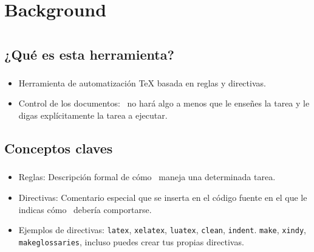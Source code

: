 \section{Background}
\begin{frame}[fragile]
\frametitle{\insertsection}
\end{frame}

\section[\arara]{\arara}

\subsection{¿Qué es esta herramienta?}

\begin{frame}
\frametitle{\insertsection}
\begin{block}{\insertsubsection}
	\begin{itemize}
		\item Herramienta de automatización \TeX{} basada en reglas y directivas.
		\item Control de los documentos: \arara\ no hará algo a menos que le enseñes la tarea y le digas explícitamente la tarea a ejecutar.
	\end{itemize}
\end{block}
\end{frame}

\subsection{Conceptos claves}

\begin{frame}
\frametitle{\insertsection}
\begin{block}{\insertsubsection}
\begin{itemize}
	\item Reglas: Descripción formal de cómo \arara\ maneja una determinada tarea.
	\item Directivas: Comentario especial que se inserta en el código fuente en el que le indicas cómo \arara\ debería comportarse.
	\item Ejemplos de directivas: \texttt{latex}, \texttt{xelatex}, \texttt{luatex}, \texttt{clean}, \texttt{indent}. \texttt{make}, \texttt{xindy}, \texttt{makeglossaries}, incluso puedes crear tus propias directivas.
\end{itemize}
\end{block}
\end{frame}

